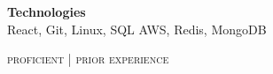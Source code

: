 \documentclass{article}
\begin{document}
\begin{minipage}[t]{0.43\textwidth}
  	\vspace{5pt}

  	\textbf{Technologies} \\
  	{\small
   		{\color{highlight}
        	React, Git, Linux, SQL
      	}
      	AWS, Redis, MongoDB
  	}

  	\vspace{5pt}

  	{\hfill\raggedleft\textsc{
   		\footnotesize{
   			{\color{highlight} proficient} | 
   			prior experience
   		}
   	}}



\vspace{10pt}
   	
\end{minipage}
\end{document}
